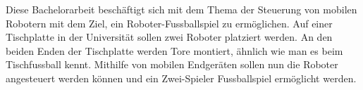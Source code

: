 Diese Bachelorarbeit beschäftigt sich mit dem Thema der Steuerung von mobilen Robotern mit dem Ziel, ein Roboter-Fussballspiel zu ermöglichen. Auf einer Tischplatte in der Universität sollen zwei Roboter platziert werden. An den beiden Enden der Tischplatte werden Tore montiert, ähnlich wie man es beim Tischfussball kennt. Mithilfe von mobilen Endgeräten sollen nun die Roboter angesteuert werden können und ein Zwei-Spieler Fussballspiel ermöglicht werden.                                                                                                                                                                                                                                                                                                                                                                                                                                                                                                                                                                                                                                                                                                                                                                                                                                                                                                                                                                                                                                                                                                                                                                                                                                                                                                                                                                                                                                                                                                                                                                                                                                                                                                                                                                                                                                                                                                                                                                                                                                                                                                                                                                                                                                                                                                                                                                                                                                                                                                                                                                                                                                                                                                                                                                                                                                                                                                                                                                                             